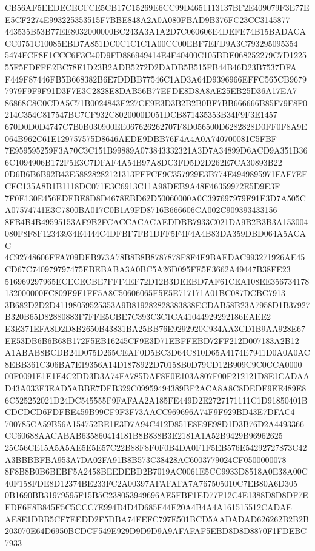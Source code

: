 \documentclass[UTF8,fontset=fandol,zihao=-4,a4paper]{ctexart}
\begin{document}
{{CB56AF5EEDECECFCE5CB17C15269E6CC99D4651113137BF2E409079F3E77EE5CF2274E993225353515F7BBE848A2A0A080FBAD9B376FC23CC3145877
443535B53B77EE8032000000BC243A3A1A2D7C060606E4DEFE74B15BADACACC0751C10085EBD7A851DC0C1C1C1A00CC00EBF7EFD9A3C793295095354
5474FCF8F1CCC6F3C40D9FD886949414E4F40400C105BDE068252279C7D122555F5FDFFE2BC78E1D23B2ADB5272D2DADB5B515FB44B46D23B7537DFA
F449F87446FB5B668382B6E7DDBB77546C1AD3A64D9396966EFFC565CB96797979F9F9F91D3F7E3C2828E8DAB56B77EFDE8D8A8AE25EB25D36A17EA7
86868C8C0CDA5C71B0024843F227CE9E3D3B2B2B0BF7BB666666B85F79F8F0214C354C817547BC7CF932C8020000D051DCB871435353B34F9F3E1457
670D0D0D4747C7B0B030900EE067626262707F8D056500D6282828D0FF0F8A9E064B962C61E129757575D8646AEDE9DBB76F4A4A0A740700081C5FBF
7E959595259F3A70C3C151B99889A073843332321A3D7A34899D6ACD9A351B366C1094906B172F5E3C7DFAF4A54B97A8DC3FD5D2D262E7CA30893B22
0D6B6B6B92B43E58828282121313FFFCF9C357929E3B774E4949895971FAF7EFCFC135A8B1B1118DC071E3C6913C11A98DEB9A48F46359972E5D9E3F
7F0E130E456EDFBE8D8D4678EBD62D50060000A0C397697979F91E3D7A505CA07574741E3C7800BA017C0B1A9FD8716B666606CA002C909393433156
8FB4B4B49595153AF9B2FCACCACACAEDDBB7933C021DA9B2B3B3A153004080F8F8F12343934E4444C4DFBF7FB1DFF5F4F4A4B83DA359DBD064A5ACAC
4C92748606FFA709DEB973A78B8B8B8787878F8F4F9BAFDAC993271926AE45CD67C740979797475EBEBABA3A0BC5A26D095FE5E3662A49447B38FE23
516969297965ECECECBE7FFF4EF72D12B3DEEBD7AF61CEA108EE356734178132000000FC809F9F1FF5A8C50606065E5E5E717171A01BC087DCBC7913
3B682D2D2D41198059525353A9B819282828383838ECDAB58B23A7958D1B37927B320B65D82880883F7FFE5CBE7C393C3C1CA41044929292186EAEE2
E3E371EFA8D2D8B2650B43831BA25BB76E9292920C934AA3CD1B9AA928E67EE53DB6B6B68B172F5EB16245CF9E3D71EBFFEBD72FF212D007183A2B12
A1ABAB8BCDB24D075D265CEAF0D5BC3D64C810D65A4174E7941D0A0A0AC8EBB361C306BA7E19356A14D1878922D70158B0D79CD12B909C9C0CCA0000
00F0091E1E1E4C2DD3D3A74FA785DAF8F0E103A807F00F212121D8E1CADAAD43A033F3EAD5ABBE7DFB329C09959494389BF2ACA8A8C8DEDE9EE489E8
6C525252021D24DC545555F9FAFAA2A185FE449D2E2727171111C1D91850401BCDCDCD6FDFBE459B99CF9F3F73AACC969696A74F9F929BD43E7DFAC4
700785CA59B56A154752BE1E3D7A94C412D851E8E9E98D1D3B76D2A4493366CC60688AACABAB635860414181B8B838B3E2181A1A52B9429B96962625
25C56CE15A5A5AE5E5E57C22B88F8F0F0B4DA0F1F5EB576E54292727873C42A3BBBBFBA953A7DA02FA91B8B573C38428AC6003779024CF0500000078
8F8B8B0B6BEBF5A2458BEEDEBD2B7019AC0061E5CC9933D8518A0E38A00C40F158FDE8D12374BE233FC2A00397AFAFAFA7A767505010C7EB80A6D305
0B1690BB31979595F15B5C238053949696AE5FBF1ED77F12C4E1388D8D8DF7EFDF6F8B845F5C5CCC7E994D4D4D685F44F20A4B4A4A161515512CADAE
AE8E1DBB5CF7EEDD2F5DBA74FEFC797E501BCD5AADADAD626262B2B2B203070E64D6950BCDCF549E929D9D9D9A9AFAFAF5EBD8D8D8870F1FDEBC7933
}}
\end{document}
